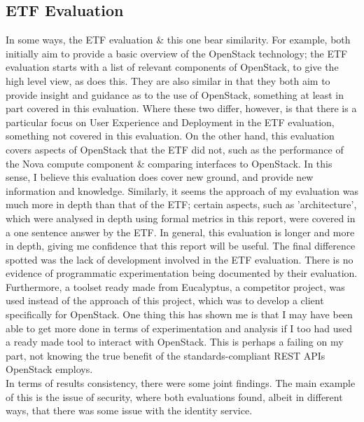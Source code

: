 \subsection{ETF Evaluation}
In some ways, the ETF evaluation\cite{etfevaluation} \& this one bear similarity. For example, both initially aim to provide a basic overview of the OpenStack technology; the ETF evaluation starts with a list of relevant components of OpenStack, to give the high level view, as does this. They are also similar in that they both aim to provide insight and guidance as to the use of OpenStack, something at least in part covered in this evaluation. Where these two differ, however, is that there is a particular focus on User Experience and Deployment in the ETF evaluation, something not covered in this evaluation. On the other hand, this evaluation covers aspects of OpenStack that the ETF did not, such as the performance of the Nova compute component \& comparing interfaces to OpenStack. In this sense, I believe this evaluation does cover new ground, and provide new information and knowledge.  
Similarly, it seems the approach of my evaluation was much more in depth than that of the ETF; certain aspects, such as 'architecture', which were analysed in depth using formal metrics in this report, were covered in a one sentence answer by the ETF. In general, this evaluation is longer and more in depth, giving me confidence that this report will be useful. 
The final difference spotted was the lack of development involved in the ETF evaluation. There is no evidence of programmatic experimentation being documented by their evaluation. Furthermore, a toolset ready made from Eucalyptus, a competitor project, was used instead of the approach of this project, which was to develop a client specifically for OpenStack. 
One thing this has shown me is that I may have been able to get more done in terms of experimentation and analysis if I too had used a ready made tool to interact with OpenStack. This is perhaps a failing on my part, not knowing the true benefit of the standards-compliant REST APIs OpenStack employs. \\
In terms of results consistency, there were some joint findings. The main example of this is the issue of security, where both evaluations found, albeit in different ways, that there was some issue with the identity service. 

